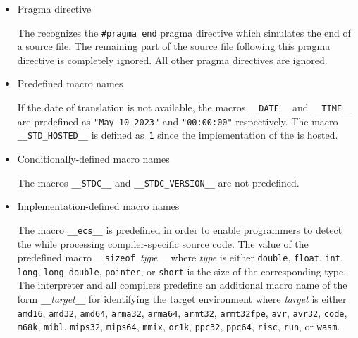 \begin{itemize}
\item Pragma directive 

The \ecs{} recognizes the \texttt{\#pragma end} pragma directive which simulates the end of a source file.
The remaining part of the source file following this pragma directive is completely ignored.
All other pragma directives are ignored.

\item Predefined macro names 

If the date of translation is not available, the macros \texttt{\_\_DATE\_\_} and \texttt{\_\_TIME\_\_} are predefined as \texttt{"May 10 2023"} and \texttt{"00:00:00"} respectively.
The macro \texttt{\_\_STD\_HOSTED\_\_} is defined as~\texttt{1} since the \cpp{} implementation of the \ecs{} is hosted.

\item Conditionally-defined macro names 

The macros \texttt{\_\_STDC\_\_} and \texttt{\_\_STDC\_VERSION\_\_} are not predefined.

\item Implementation-defined macro names 

The macro \texttt{\_\_ecs\_\_} is predefined in order to enable programmers to detect the \ecs{} while processing compiler-specific source code.
The value of the predefined macro \texttt{\_\_sizeof\_}\textit{type}\texttt{\_\_} where \textit{type} is either \texttt{double}, \texttt{float}, \texttt{int}, \texttt{long}, \texttt{long_double}, \texttt{pointer}, or \texttt{short} is the size of the corresponding type.
The interpreter and all compilers predefine an additional macro name of the form \texttt{\_\_}\textit{target}\texttt{\_\_} for identifying the target environment where \textit{target} is either \texttt{amd16}, \texttt{amd32}, \texttt{amd64}, \texttt{arma32}, \texttt{arma64}, \texttt{armt32}, \texttt{armt32fpe}, \texttt{avr}, \texttt{avr32}, \texttt{code}, \texttt{m68k}, \texttt{mibl}, \texttt{mips32}, \texttt{mips64}, \texttt{mmix}, \texttt{or1k}, \texttt{ppc32}, \texttt{ppc64}, \texttt{risc}, \texttt{run}, or \texttt{wasm}.

\end{itemize}


